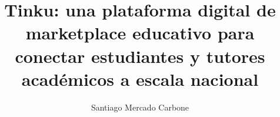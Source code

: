 \documentclass[%
    language=spanish,   %
    guias=false,         %
    pdfa=true,         %
]{usal-proyecto-final}
\title{Tinku: una plataforma digital de marketplace educativo para\\
       conectar estudiantes y tutores académicos a escala nacional}
\author{Santiago Mercado Carbone}
\begin{document}
    \raggedbottom

    \frontmatter

    \mainmatter
    
    
    
    
    
    
    
    

    \backmatter

    \begin{appendices}
        
        
        
        
        
        
        
    \end{appendices}

    \begin{anexos}
        
        
    \end{anexos}

    \glosarios
\end{document}
